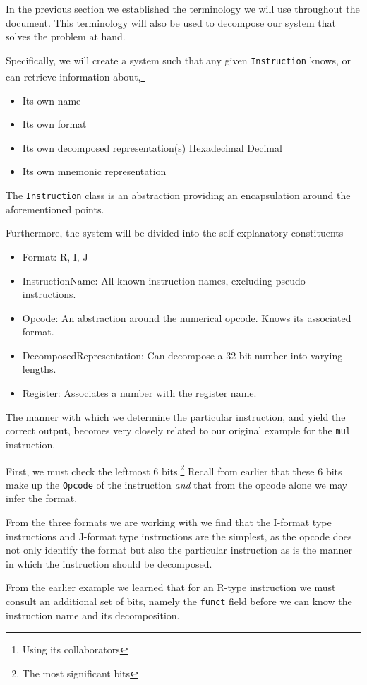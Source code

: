 In the previous section we established the terminology we will use
throughout the document. This terminology will also be used to
decompose our system that solves the problem at hand.

Specifically, we will create a system such that any given
\texttt{Instruction} knows, or can retrieve information
about,\footnote{Using its collaborators}

\begin{itemize}
\item Its own name
\item Its own format
\item Its own decomposed representation(s)
\subitem Hexadecimal
\subitem Decimal
\item Its own mnemonic representation
\end{itemize}

The \texttt{Instruction} class is an abstraction providing an
encapsulation around the aforementioned points.

Furthermore, the system will be divided into the self-explanatory
constituents

\begin{itemize}
\item Format: R, I, J
\item InstructionName: All known instruction names, excluding
  pseudo-instructions.
\item Opcode: An abstraction around the numerical opcode. Knows its
  associated format.
\item DecomposedRepresentation: Can decompose a 32-bit number into
  varying lengths.
\item Register: Associates a number with the register name.
\end{itemize}

The manner with which we determine the particular instruction, and
yield the correct output, becomes very closely related to our original
example for the \texttt{mul} instruction.

First, we must check the leftmost 6 bits.\footnote{The most
  significant bits} Recall from earlier that these 6 bits make up the
\texttt{Opcode} of the instruction \emph{and} that from the opcode
alone we may infer the format.

From the three formats we are working with we find that the I-format
type instructions and J-format type instructions are the simplest, as
the opcode does not only identify the format but also the particular
instruction as is the manner in which the instruction should be
decomposed.

From the earlier example we learned that for an R-type instruction we
must consult an additional set of bits, namely the \texttt{funct}
field before we can know the instruction name and its decomposition.

